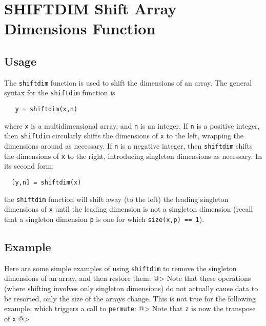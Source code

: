\section{SHIFTDIM Shift Array Dimensions Function}

\subsection{Usage}

The \verb|shiftdim| function is used to shift the dimensions of an array.
The general syntax for the \verb|shiftdim| function is
\begin{verbatim}
   y = shiftdim(x,n)
\end{verbatim}
where \verb|x| is a multidimensional array, and \verb|n| is an integer.  If
\verb|n| is a positive integer, then \verb|shiftdim| circularly shifts the 
dimensions of \verb|x| to the left, wrapping the dimensions around as 
necessary.  If \verb|n| is a negative integer, then \verb|shiftdim| shifts
the dimensions of \verb|x| to the right, introducing singleton dimensions
as necessary.  In its second form:
\begin{verbatim}
  [y,n] = shiftdim(x)
\end{verbatim}
the \verb|shiftdim| function will shift away (to the left) the leading
singleton dimensions of \verb|x| until the leading dimension is not
 a singleton dimension (recall that a singleton dimension \verb|p| is one for
which \verb|size(x,p) == 1|).
\subsection{Example}

Here are some simple examples of using \verb|shiftdim| to remove the singleton
dimensions of an array, and then restore them:
@>
Note that these operations (where shifting involves only singleton dimensions)
do not actually cause data to be resorted, only the size of the arrays change.
This is not true for the following example, which triggers a call to \verb|permute|:
@>
 Note that \verb|z| is now the transpose of \verb|x|
@>
